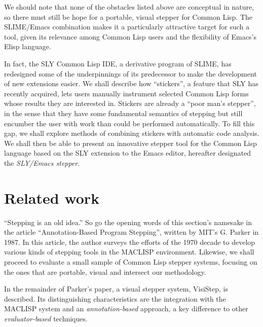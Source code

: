 \documentclass[sigconf]{acmart}
\begin{document}
We should note that none of the obstacles listed above are conceptual
in nature, so there must still be hope for a portable, visual stepper
for Common Lisp. The SLIME/Emacs combination makes it a particularly
attractive target for such a tool, given its relevance among Common
Lisp users and the flexibility of Emacs's Elisp language.

In fact, the SLY Common Lisp IDE\cite{sly}, a derivative program of
SLIME, has redesigned some of the underpinnings of its predecessor to
make the development of new extensions easier.  We shall describe how
``stickers'', a feature that SLY has recently acquired, lets users
manually instrument selected Common Lisp forms whose results they are
interested in.  Stickers are already a ``poor man's stepper'', in the
sense that they have some fundamental semantics of stepping but still
encumber the user with work than could be performed automatically.  To
fill this gap, we shall explore methods of combining stickers with
automatic code analysis.  We shall then be able to present an
innovative stepper tool for the Common Lisp language based on the SLY
extension to the Emacs editor, hereafter designated the
\emph{SLY/Emacs stepper}.

\section{Related work}

``Stepping is an old idea.''  So go the opening words of this
section's namesake in the article ``Annotation-Based Program
Stepping'', written by MIT's G. Parker in 1987\cite{annotation-based}.
In this article, the author surveys the efforts of the 1970 decade to
develop various kinds of stepping tools in the MACLISP environment.
Likewise, we shall proceed to evaluate a small sample of Common Lisp
stepper systems, focusing on the ones that are portable, visual and
intersect our methodology.

In the remainder of Parker's paper\cite{annotation-based}, a
visual stepper system, VisiStep, is described.  Its distinguishing
characteristics are the integration with the MACLISP system and an
\emph{annotation-based} approach, a key difference to other
\emph{evaluator-based} techniques.
\end{document}

